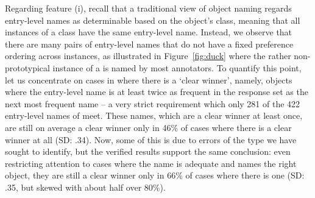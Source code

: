 Regarding feature (i), recall that a traditional view of object naming regards entry-level names as determinable based on the object's class, meaning that all instances of a class have the same entry-level name. 
Instead, we observe that there are many pairs of entry-level names that do not have a fixed preference ordering across instances, as illustrated in Figure~\ref{fig:duck} where the rather non-prototypical instance of a  is named  by most annotators.
To quantify this point, let us concentrate on cases in \mn where there is a `clear winner', namely, objects where the entry-level name is at least twice as frequent in the response set as the next most frequent name -- a very strict requirement which only 281 of the 422 entry-level names of \mn meet.
These names, which are a clear winner at least once, are still on average a clear winner only in 46\% of cases where there is a clear winner at all (SD: .34).
Now, some of this is due to errors of the type we have sought to identify, but the verified results support the same conclusion: 
even restricting attention to cases where the name is adequate and names the right object, they are still a clear winner only in 66\% of cases where there is one (SD: .35, but skewed with about half over 80\%).


